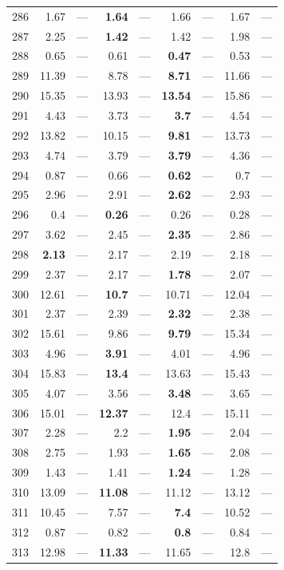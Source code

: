 \begin{longtable}{lr@{\hskip 4pt}l@{\hskip 12pt}r@{\hskip 4pt}l@{\hskip 12pt}r@{\hskip 4pt}l@{\hskip 12pt}r@{\hskip 4pt}l@{\hskip 12pt}}
286 & 1.67 & --- & \textbf{1.64} & --- & 1.66 & --- & 1.67 & --- \\
287 & 2.25 & --- & \textbf{1.42} & --- & 1.42 & --- & 1.98 & --- \\
288 & 0.65 & --- & 0.61 & --- & \textbf{0.47} & --- & 0.53 & --- \\
289 & 11.39 & --- & 8.78 & --- & \textbf{8.71} & --- & 11.66 & --- \\
290 & 15.35 & --- & 13.93 & --- & \textbf{13.54} & --- & 15.86 & --- \\
291 & 4.43 & --- & 3.73 & --- & \textbf{3.7} & --- & 4.54 & --- \\
292 & 13.82 & --- & 10.15 & --- & \textbf{9.81} & --- & 13.73 & --- \\
293 & 4.74 & --- & 3.79 & --- & \textbf{3.79} & --- & 4.36 & --- \\
294 & 0.87 & --- & 0.66 & --- & \textbf{0.62} & --- & 0.7 & --- \\
295 & 2.96 & --- & 2.91 & --- & \textbf{2.62} & --- & 2.93 & --- \\
296 & 0.4 & --- & \textbf{0.26} & --- & 0.26 & --- & 0.28 & --- \\
297 & 3.62 & --- & 2.45 & --- & \textbf{2.35} & --- & 2.86 & --- \\
298 & \textbf{2.13} & --- & 2.17 & --- & 2.19 & --- & 2.18 & --- \\
299 & 2.37 & --- & 2.17 & --- & \textbf{1.78} & --- & 2.07 & --- \\
300 & 12.61 & --- & \textbf{10.7} & --- & 10.71 & --- & 12.04 & --- \\
301 & 2.37 & --- & 2.39 & --- & \textbf{2.32} & --- & 2.38 & --- \\
302 & 15.61 & --- & 9.86 & --- & \textbf{9.79} & --- & 15.34 & --- \\
303 & 4.96 & --- & \textbf{3.91} & --- & 4.01 & --- & 4.96 & --- \\
304 & 15.83 & --- & \textbf{13.4} & --- & 13.63 & --- & 15.43 & --- \\
305 & 4.07 & --- & 3.56 & --- & \textbf{3.48} & --- & 3.65 & --- \\
306 & 15.01 & --- & \textbf{12.37} & --- & 12.4 & --- & 15.11 & --- \\
307 & 2.28 & --- & 2.2 & --- & \textbf{1.95} & --- & 2.04 & --- \\
308 & 2.75 & --- & 1.93 & --- & \textbf{1.65} & --- & 2.08 & --- \\
309 & 1.43 & --- & 1.41 & --- & \textbf{1.24} & --- & 1.28 & --- \\
310 & 13.09 & --- & \textbf{11.08} & --- & 11.12 & --- & 13.12 & --- \\
311 & 10.45 & --- & 7.57 & --- & \textbf{7.4} & --- & 10.52 & --- \\
312 & 0.87 & --- & 0.82 & --- & \textbf{0.8} & --- & 0.84 & --- \\
313 & 12.98 & --- & \textbf{11.33} & --- & 11.65 & --- & 12.8 & --- \\
\bottomrule
\end{longtable}